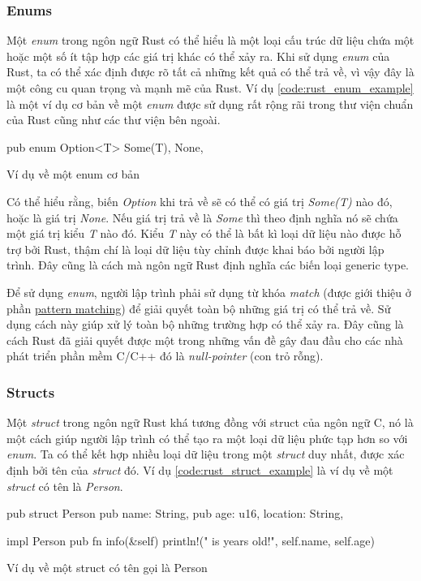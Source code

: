 \subsubsection{Enums}
Một \emph{enum} trong ngôn ngữ Rust có thể hiểu là một loại cấu trúc dữ liệu chứa một hoặc một số ít tập hợp các giá trị khác có thể xảy ra.
Khi sử dụng \emph{enum} của Rust, ta có thể xác định được rõ tất cả những kết quả có thể trả về, vì vậy đây là một công cu quan trọng và mạnh mẽ của Rust.
Ví dụ \ref{code:rust_enum_example} là một ví dụ cơ bản về một \emph{enum} được sử dụng rất rộng rãi trong thư viện chuẩn của Rust cũng như các thư viện bên ngoài.
\begin{listing}
\begin{rustcode}
pub enum Option<T> {
  Some(T),
  None,
}
\end{rustcode}
\caption{Ví dụ về một enum cơ bản}
\label{code:rust_enum_example}
\end{listing}

Có thể hiểu rằng, biến \emph{Option} khi trả về sẽ có thể có giá trị \emph{Some(T)} nào đó, hoặc là giá trị \emph{None}.
Nếu giá trị trả về là \emph{Some} thì theo định nghĩa nó sẽ chứa một giá trị kiểu \emph{T} nào đó.
Kiểu \emph{T} này có thể là bất kì loại dữ liệu nào được hỗ trợ bởi Rust, thậm chí là loại dữ liệu tùy chỉnh được khai báo bởi người lập trình.
Đây cũng là cách mà ngôn ngữ Rust định nghĩa các biến loại generic type.

Để sử dụng \emph{enum}, người lập trình phải sử dụng từ khóa \emph{match} (được giới thiệu ở phần \hyperref[pattern_matching]{pattern matching}) để giải quyết toàn bộ những giá trị có thể trả về.
Sử dụng cách này giúp xử lý toàn bộ những trường hợp có thể xảy ra.
Đây cũng là cách Rust đã giải quyết được một trong những vấn đề gây đau đầu cho các nhà phát triển phần mềm C/C++ đó là \emph{null-pointer} (con trỏ rỗng).

\subsubsection{Structs}
Một \emph{struct} trong ngôn ngữ Rust khá tương đồng với struct của ngôn ngữ C, nó là một cách giúp người lập trình có thể tạo ra một loại dữ liệu phức tạp hơn so với \emph{enum}.
Ta có thể kết hợp nhiều loại dữ liệu trong một \emph{struct} duy nhất, được xác định bởi tên của \emph{struct} đó.
Ví dụ \ref*{code:rust_struct_example} là ví dụ về một \emph{struct} có tên là \emph{Person}.

\begin{listing}
\begin{rustcode}
pub struct Person {
  pub name: String,
  pub age: u16,
  location: String,
}

impl Person {
  pub fn info(&self) {
    println!("{} is {} years old!", self.name, self.age)
  }
}
\end{rustcode}
\caption{Ví dụ về một struct có tên gọi là Person}
\label{code:rust_struct_example}
\end{listing}

